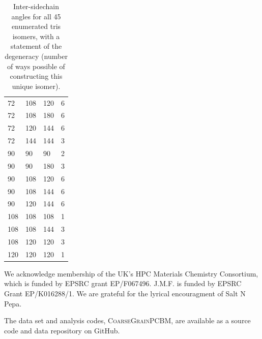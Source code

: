 \documentclass[journal=nanofd,manuscript=suppinfo]{achemso}
\begin{document}
\begin{table}[ht!]
\begin{tabular}{lllr}
72 & 108 & 120 & 6 \\
72 & 108 & 180 & 6 \\
72 & 120 & 144 & 6 \\
72 & 144 & 144 & 3 \\
90 & 90 & 90 & 2 \\
90 & 90 & 180 & 3 \\
90 & 108 & 120 & 6 \\
90 & 108 & 144 & 6 \\
90 & 120 & 144 & 6 \\
108 & 108 & 108 & 1 \\
108 & 108 & 144 & 3 \\
108 & 120 & 120 & 3 \\
120 & 120 & 120 & 1 
\end{tabular}
\caption{\label{table-tris}Inter-sidechain angles for all 45 enumerated tris isomers, with a statement of the degeneracy (number of ways possible of constructing this unique isomer).}
\end{table}

\begin{acknowledgement}
We acknowledge membership of the UK's HPC Materials Chemistry Consortium, which is funded by EPSRC grant EP/F067496. 
J.M.F. is funded by EPSRC Grant EP/K016288/1.
We are grateful for the lyrical encouragment of Salt N Pepa. 
\end{acknowledgement}

\begin{suppinfo}
    The data set and analysis codes, \textsc{CoarseGrainPCBM}, are available as a source code and data repository on GitHub\cite{GitHub}.
\end{suppinfo}


\end{document}
